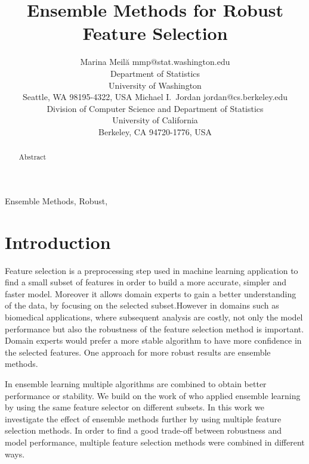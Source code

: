 \documentclass[twoside,11pt]{article}
\begin{document}
\title{Ensemble Methods for Robust Feature Selection}

\author{\name Marina Meil\u{a} \email mmp@stat.washington.edu \\
       \addr Department of Statistics\\
       University of Washington\\
       Seattle, WA 98195-4322, USA
       \AND
       \name Michael I.\ Jordan \email jordan@cs.berkeley.edu \\
       \addr Division of Computer Science and Department of Statistics\\
       University of California\\
       Berkeley, CA 94720-1776, USA}


\maketitle

\begin{abstract}%
  Abstract
\end{abstract}

\begin{keywords}
  Ensemble Methods, Robust, 
\end{keywords}

\section{Introduction}

Feature selection is a preprocessing step used in machine learning application to find
a small subset of features in order to build a more accurate, simpler and faster model.
Moreover it allows domain experts to gain a better understanding of the data, by focusing
 on the selected subset.However in domains such as biomedical applications, 
where subsequent analysis are costly, not only the model performance but also the robustness
 of the feature selection method is important. Domain experts would prefer a more stable
 algorithm to have more confidence in the selected features. One approach for more robust
 results are ensemble methods.

In ensemble learning multiple algorithms are combined to obtain better performance or stability.
We build on the work of \cite{saeys2008} who applied ensemble learning by using
the same feature selector on different subsets. In this work we investigate the effect of ensemble methods
further by using multiple feature selection methods. In order to find a good trade-off between robustness
and model performance, multiple feature selection methods were combined in different ways.
\end{document}
